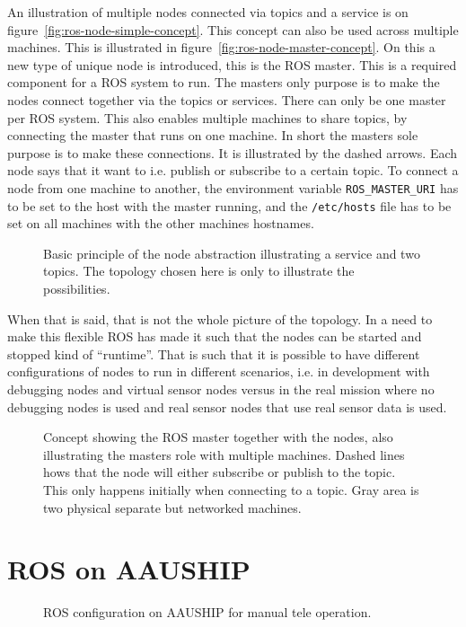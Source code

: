 An illustration of multiple nodes connected via topics and a service
is on figure~\vref{fig:ros-node-simple-concept}. This concept can also
be used across multiple machines. This is illustrated in
figure~\vref{fig:ros-node-master-concept}. On this a new type of unique
node is introduced, this is the \ac{ROS} master. This is a required
component for a ROS system to run. The masters only purpose is to make
the nodes connect together via the topics or services. There can only
be one master per \ac{ROS} system. This also enables multiple machines
to share topics, by connecting the master that runs on one machine. In
short the masters sole purpose is to make these connections. It is
illustrated by the dashed arrows. Each node says that it want to i.e.
publish or subscribe to a certain topic. To connect a node from one
machine to another, the environment variable \texttt{ROS\_MASTER\_URI}
has to be set to the host with the master running, and the
\texttt{/etc/hosts} file has to be set on all machines with the other
machines hostnames.

\begin{figure}[htbp]
	\centering
	
	\caption{Basic principle of the node abstraction illustrating a
	service and two topics. The topology chosen here is only to illustrate
	the possibilities.}
	\label{fig:ros-node-simple-concept}
\end{figure}

When that is said, that is not the whole picture of the topology. In a
need to make this flexible \ac{ROS} has made it such that the nodes
can be started and stopped kind of ``runtime''. That is such that it is
possible to have different configurations of nodes to run in different
scenarios, i.e. in development with debugging nodes and virtual sensor
nodes versus in the real mission where no debugging nodes is used and
real sensor nodes that use real sensor data is used.

\begin{figure}[htbp]
	\centering
	
	\caption{Concept showing the ROS master together with the nodes,
	also illustrating the masters role with multiple machines. Dashed
	lines hows that the node will either subscribe or publish to the
	topic. This only happens initially when connecting to a topic. Gray
	area is two physical separate but networked machines.}
	\label{fig:ros-node-master-concept}
\end{figure}

\section{ROS on AAUSHIP}
\begin{figure}[htbp]
	\centering
	
	\caption{ROS configuration on AAUSHIP for manual tele operation.}
	\label{fig:ros-aauship-teleop}
\end{figure}

